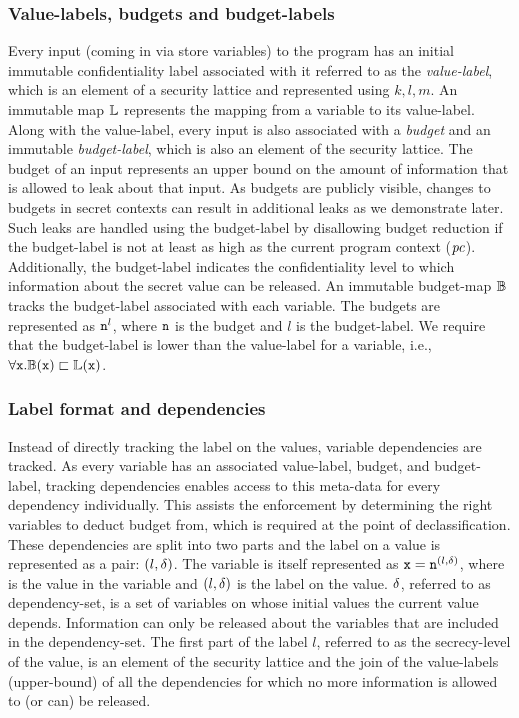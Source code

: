 \subsubsection{\textbf{Value-labels, budgets and budget-labels}}
Every input (coming in via store variables) to the program has an
initial immutable confidentiality label associated with it referred to
as the \emph{value-label}, which is an element of a security lattice
and represented using $k, l, m$. An immutable map $\mathbb{L}$
represents the mapping from a variable to its value-label. Along with
the value-label, every input is also associated with a \emph{budget}
and an immutable \emph{budget-label}, which is also an element 
of the security lattice. The budget of an input
represents an upper bound on the amount of information that is allowed
to leak about that input. As budgets are publicly visible, changes to
budgets in secret contexts can result in additional leaks as we
demonstrate later. Such leaks are handled using the budget-label by  
disallowing budget reduction if the budget-label is not at least as
high as the current program context ($\mathit{pc}$). Additionally, the
budget-label indicates the confidentiality level to which information
about the secret value can be released. An immutable budget-map $\mathbb{B}$
tracks the budget-label associated with each variable. 
The budgets are represented as $\texttt{n}^l$, where $\texttt{n}$ is the
budget and $l$ is the budget-label. We require that the budget-label 
is lower than the value-label for a variable, i.e., 
$\forall \texttt{x}.\mathbb{B}(\texttt{x}) \sqsubset \mathbb{L}(\texttt{x})$.

\subsubsection{\textbf{Label format and dependencies}}
Instead of directly tracking the label on the values, variable
dependencies are tracked. As every variable has
an associated value-label, budget, and budget-label, tracking
dependencies enables access to this meta-data for every dependency
individually. This assists the enforcement by determining the right
variables to deduct budget from, which is required at the point of
declassification. These dependencies are split into two parts and the
label on a value is represented as a pair: $(l, \delta)$. The variable
is itself represented as $\texttt{x} = \texttt{n}^{(l, \delta)}$, where 
is the value in the variable  and $(l, \delta)$ is the label on
the value. $\delta$, referred to as dependency-set, is a set of
variables on whose initial values the current value
depends. Information can only be released about the variables that are
included in the dependency-set. The first part of the label $l$,
referred to as the secrecy-level of the value, is an element of the 
security lattice and the join of the 
value-labels (upper-bound) of all the dependencies for which no more
information is allowed to (or can) be released. 

